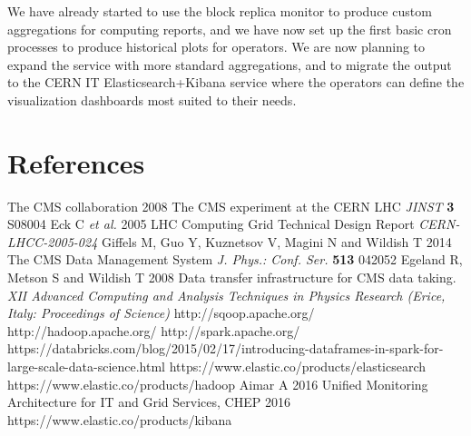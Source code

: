 \documentclass[a4paper]{jpconf}
\begin{document}
We have already started to use the block replica monitor to produce custom aggregations for computing reports, and we have now set up the first basic cron processes to produce historical plots for operators. We are now planning to expand the service with more standard aggregations, and to migrate the output to the CERN IT Elasticsearch+Kibana service where the operators can define the visualization dashboards most suited to their needs.


\section*{References}
\medskip
\begin{thebibliography}{9}
 The CMS collaboration 2008 The CMS experiment at the CERN LHC {\it JINST} {\bf 3} S08004
 Eck C {\it et al.} 2005 LHC Computing Grid Technical Design Report {\it CERN-LHCC-2005-024}
 Giffels M, Guo Y, Kuznetsov V, Magini N and Wildish T 2014 The CMS Data Management System {\it J. Phys.: Conf. Ser.} {\bf 513} 042052 
 Egeland R, Metson S and Wildish T 2008 Data transfer infrastructure for CMS data taking. {\it XII Advanced Computing and Analysis Techniques in Physics Research (Erice, Italy: 
Proceedings of Science)}
 http://sqoop.apache.org/
 http://hadoop.apache.org/ 
 http://spark.apache.org/
 https://databricks.com/blog/2015/02/17/introducing-dataframes-in-spark-for-large-scale-data-science.html
 https://www.elastic.co/products/elasticsearch
 https://www.elastic.co/products/hadoop 
 Aimar A 2016 Unified Monitoring Architecture for IT and Grid Services, CHEP 2016
 https://www.elastic.co/products/kibana
\end{thebibliography}
\smallskip
\end{document}
